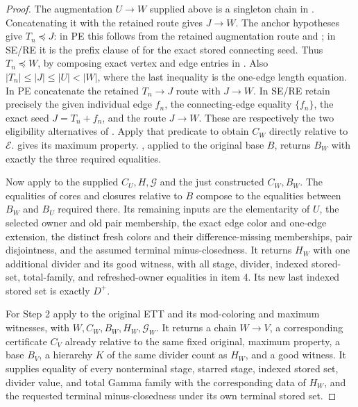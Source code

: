 \begin{proof}
The augmentation $U\longrightarrow W$ supplied above is a singleton
chain in . Concatenating it
with the retained route gives $J\longrightarrow W$.
The anchor hypotheses give $T_n\preccurlyeq J$: in PE this follows from
the retained augmentation route and
; in SE/RE it is
the prefix clause of  for the exact
stored connecting seed. Thus $T_n\preccurlyeq W$, by composing exact
vertex and edge entries in .
Also $|T_n|\leq|J|\leq|U|<|W|$, where the last inequality is the
one-edge length equation. In PE concatenate the retained
$T_n\longrightarrow J$ route with $J\longrightarrow W$.
In SE/RE retain precisely the given individual edge $f_n$, the
connecting-edge equality $\{f_n\}$, the exact seed $J=T_n+f_n$, and
the route $J\longrightarrow W$. These are respectively the two
eligibility alternatives of .
Apply that predicate to obtain $C_W$ directly relative to $\mathcal E$.
 gives its maximum property.
, applied to the original
base $B$, returns $B_W$ with exactly the three required equalities.

Now apply  to the supplied
$C_U,H,\mathcal G$ and the just constructed $C_W,B_W$. The equalities
of cores and closures relative to $B$ compose to the equalities
between $B_W$ and $B_U$ required there. Its remaining inputs are the
elementarity of $U$, the selected owner and old pair membership, the
exact edge color and one-edge extension, the distinct fresh colors and
their difference-missing memberships, pair disjointness, and the
assumed terminal minus-closedness. It returns $H_W$ with one additional
divider and its good witness, with all stage, divider, indexed
stored-set, total-family, and refreshed-owner equalities in item 4.
Its new last indexed stored set is exactly $D^+$.

For Step 2 apply  to
the original ETT and its mod-coloring and maximum witnesses, with
$W,C_W,B_W,H_W,\mathcal G_W$. It returns a chain
$W\longrightarrow V$, a corresponding certificate $C_V$ already
relative to the same fixed original, maximum property, a base $B_V$,
a hierarchy $K$ of the same divider count as $H_W$, and a good witness.
It supplies equality of every nonterminal stage, starred stage,
indexed stored set, divider value, and total Gamma family with the
corresponding data of $H_W$, and the requested terminal
minus-closedness under its own terminal stored set.


\end{proof}
